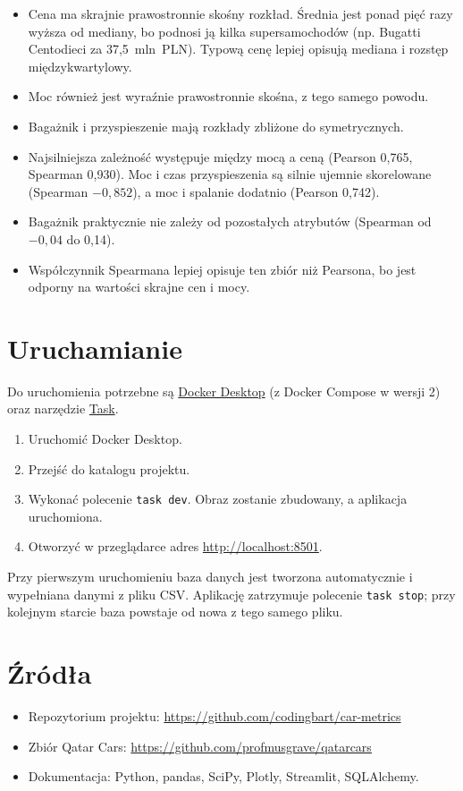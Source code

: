 \documentclass[11pt,a4paper]{article}
\begin{document}
\begin{itemize}
  \item Cena ma skrajnie prawostronnie skośny rozkład. Średnia jest ponad pięć razy wyższa
  od mediany, bo podnosi ją kilka supersamochodów (np. Bugatti Centodieci za
  37,5~mln~PLN). Typową cenę lepiej opisują mediana i rozstęp międzykwartylowy.
  \item Moc również jest wyraźnie prawostronnie skośna, z tego samego powodu.
  \item Bagażnik i przyspieszenie mają rozkłady zbliżone do symetrycznych.
  \item Najsilniejsza zależność występuje między mocą a ceną (Pearson 0,765,
  Spearman 0,930). Moc i czas przyspieszenia są silnie ujemnie skorelowane
  (Spearman $-0{,}852$), a moc i spalanie dodatnio (Pearson 0,742).
  \item Bagażnik praktycznie nie zależy od pozostałych atrybutów
  (Spearman od $-0{,}04$ do 0,14).
  \item Współczynnik Spearmana lepiej opisuje ten zbiór niż Pearsona, bo jest odporny
  na wartości skrajne cen i mocy.
\end{itemize}

\section{Uruchamianie}

Do uruchomienia potrzebne są
\href{https://www.docker.com/products/docker-desktop/}{Docker Desktop}
(z Docker Compose w wersji 2) oraz narzędzie \href{https://taskfile.dev}{Task}.

\begin{enumerate}
  \item Uruchomić Docker Desktop.
  \item Przejść do katalogu projektu.
  \item Wykonać polecenie \texttt{task dev}. Obraz zostanie zbudowany, a aplikacja uruchomiona.
  \item Otworzyć w przeglądarce adres \url{http://localhost:8501}.
\end{enumerate}

Przy pierwszym uruchomieniu baza danych jest tworzona automatycznie i wypełniana danymi
z pliku CSV. Aplikację zatrzymuje polecenie \texttt{task stop}; przy kolejnym starcie baza
powstaje od nowa z tego samego pliku.

\section{Źródła}

\begin{itemize}
  \item Repozytorium projektu: \url{https://github.com/codingbart/car-metrics}
  \item Zbiór Qatar Cars: \url{https://github.com/profmusgrave/qatarcars}
  \item Dokumentacja: Python, pandas, SciPy, Plotly, Streamlit, SQLAlchemy.
\end{itemize}
\end{document}

